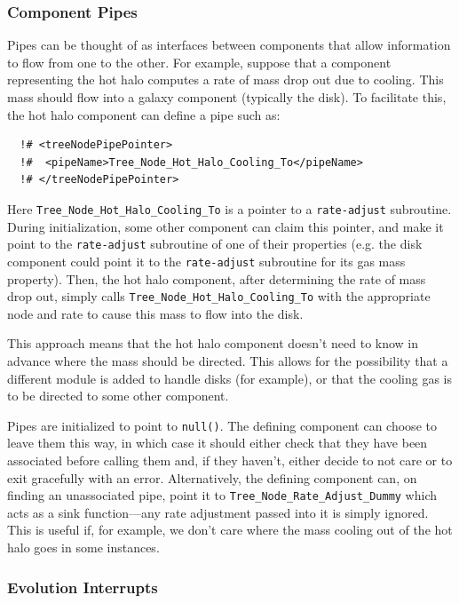 \subsubsection{Component Pipes}

Pipes can be thought of as interfaces between components that allow information to flow from one to the other. For example, suppose that a component representing the hot halo computes a rate of mass drop out due to cooling. This mass should flow into a galaxy component (typically the disk). To facilitate this, the hot halo component can define a pipe such as:
\begin{verbatim}
  !# <treeNodePipePointer>
  !#  <pipeName>Tree_Node_Hot_Halo_Cooling_To</pipeName>
  !# </treeNodePipePointer>
\end{verbatim}
Here {\tt Tree\_Node\_Hot\_Halo\_Cooling\_To} is a pointer to a {\tt rate-adjust} subroutine. During initialization, some other component can claim this pointer, and make it point to the {\tt rate-adjust} subroutine of one of their properties (e.g. the disk component could point it to the {\tt rate-adjust} subroutine for its gas mass property). Then, the hot halo component, after determining the rate of mass drop out, simply calls {\tt Tree\_Node\_Hot\_Halo\_Cooling\_To} with the appropriate node and rate to cause this mass to flow into the disk. 

This approach means that the hot halo component doesn't need to know in advance where the mass should be directed. This allows for the possibility that a different module is added to handle disks (for example), or that the cooling gas is to be directed to some other component.

Pipes are initialized to point to {\tt null()}. The defining component can choose to leave them this way, in which case it should either check that they have been associated before calling them and, if they haven't, either decide to not care or to exit gracefully with an error. Alternatively, the defining component can, on finding an unassociated pipe, point it to {\tt Tree\_Node\_Rate\_Adjust\_Dummy} which acts as a sink function---any rate adjustment passed into it is simply ignored. This is useful if, for example, we don't care where the mass cooling out of the hot halo goes in some instances.

\subsubsection{Evolution Interrupts}

